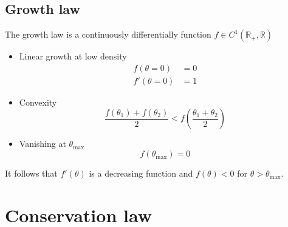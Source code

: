 \documentclass[12pt]{amsart}
\begin{document}
\subsection{Growth law}

The growth law is a continuously differentially function $f \in C^{1}\left(\mathbb{R}_{+}, \mathbb{R}\right)$
\begin{itemize}
\item Linear growth at low density
  \begin{align}
    f(\theta=0) &= 0 \\
    f'(\theta = 0) &= 1
  \end{align}
\item Convexity
  \begin{equation}
    \frac{f(\theta_1) + f(\theta_2)}{2} < f\left(\frac{\theta_1 + \theta_2}{2}\right)
  \end{equation}
\item Vanishing at $\theta_{\text{max}}$
  \begin{equation}
    f(\theta_{\text{max}}) = 0
  \end{equation}
\end{itemize}

It follows that $f'(\theta)$ is a decreasing function and $f(\theta) <
0$ for $\theta>\theta_{\text{max}}$.  


\section{Conservation law}
\end{document}
